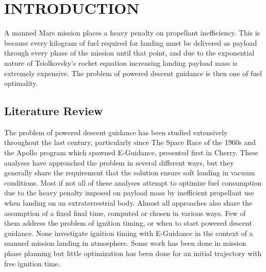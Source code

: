 %

\chapter{INTRODUCTION}
\label{chap:intro}
A manned Mars mission places a heavy penalty on propellant inefficiency. This is because every kilogram of fuel required for landing must be delivered as payload through every phase of the mission until that point, and due to the exponential nature of Tsiolkovsky's rocket equation increasing landing payload mass is extremely expensive. The problem of powered descent guidance is then one of fuel optimality.

\section{Literature Review}
The problem of powered descent guidance has been studied extensively throughout the last century, particularly since The Space Race of the 1960s and the Apollo program which spawned E-Guidance, presented first in Cherry\:\cite{CHERRY}. These analyses have approached the problem in several different ways, but they generally share the requirement that the solution ensure soft landing in vacuum conditions. Most if not all of these analyses attempt to optimize fuel consumption due to the heavy penalty imposed on payload mass by inefficient propellant use when landing on an extraterrestrial body. Almost all approaches also share the assumption of a fixed final time, computed or chosen in various ways. Few of them address the problem of ignition timing, or when to start powered descent guidance. None investigate ignition timing with E-Guidance in the context of a manned mission landing in atmosphere. Some work has been done in mission phase planning but little optimization has been done for an  initial trajectory with free ignition time.

